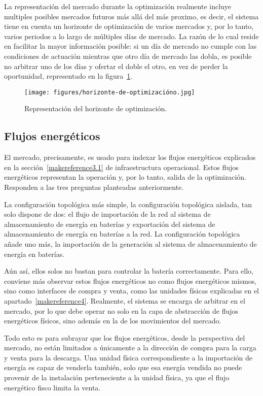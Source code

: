 La representación del mercado durante la optimización realmente incluye multiples posibles mercados futuros más allá del más proximo, es decir, el sistema tiene en cuenta un horizonte de optimización de varios mercados y, por lo tanto, varios periodos a lo largo de múltiples días de mercado. La razón de lo cual reside en facilitar la mayor información posible: si un día de mercado no cumple con las condiciones de actuación mientras que otro día de mercado las dobla, es posible no arbitrar uno de los días y ofertar el doble el otro, en vez de perder la oportunidad, representado en la figura~\ref{fig:horizonte-de-optimizacióno}.

\begin{figure}
  \centering
  \texttt{[image: figures/horizonte-de-optimizacióno.jpg]}
  \caption{Representación del horizonte de optimización.}
  \label{fig:horizonte-de-optimizacióno}
\end{figure}

\subsection{Flujos energéticos}
\label{makereference5.1.2}

El mercado, precisamente, es usado para indexar los flujos energéticos explicados en la sección~\ref{makereference3.1} de infraestructura operacional. Estos flujos energéticos representan la operación y, por lo tanto, salida de la optimización. Responden a las tres preguntas planteadas anteriormente.

La configuración topológica más simple, la configuración topológica aislada, tan solo dispone de dos: el flujo de importación de la red al sistema de almacenamiento de energía en baterías y exportación del sistema de almacenamiento de energía en baterías a la red. La configuración topológica añade uno más, la importación de la generación al sistema de almacenamiento de energía en baterías.

Aún así, ellos solos no bastan para controlar la batería correctamente. Para ello, conviene más observar estos flujos energéticos no como flujos energéticos mismos, sino como interfaces de compra y venta, como las unidades físicas explicadas en el apartado~\ref{makereference4}. Realmente, el sistema se encarga de arbitrar en el mercado, por lo que debe operar no solo en la capa de abstracción de flujos energéticos físicos, sino además en la de los movimientos del mercado.

Todo esto es para subrayar que los flujos energéticos, desde la perspectiva del mercado, no están limitados a únicamente a la dirección de compra para la carga y venta para la descarga. Una unidad física correspondiente a la importación de energía es capaz de venderla también, solo que esa energía vendida no puede provenir de la instalación perteneciente a la unidad física, ya que el flujo energético fisco limita la venta.

